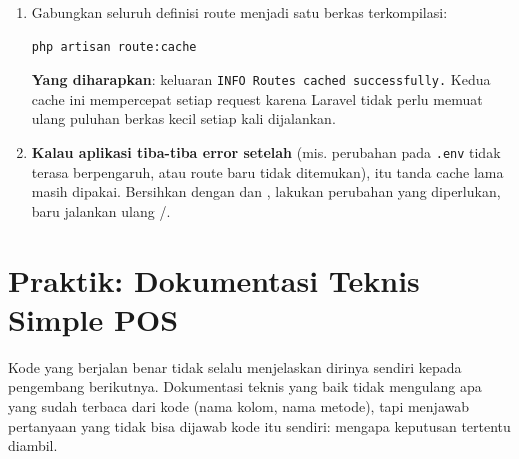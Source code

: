 \begin{enumerate}
    \texttt{INFO Configuration cached successfully.}
  \item Gabungkan seluruh definisi route menjadi satu berkas
    terkompilasi:
    \begin{lstlisting}[language=bash]
php artisan route:cache
    \end{lstlisting}
    \textbf{Yang diharapkan}: keluaran \texttt{INFO Routes cached
    successfully.} Kedua cache ini mempercepat setiap request karena
    Laravel tidak perlu memuat ulang puluhan berkas kecil setiap kali
    dijalankan.
  \item \textbf{Kalau aplikasi tiba-tiba error setelah
    } (mis. perubahan pada \texttt{.env} tidak
    terasa berpengaruh, atau route baru tidak ditemukan), itu tanda
    cache lama masih dipakai. Bersihkan dengan
     dan
    , lakukan perubahan yang
    diperlukan, baru jalankan ulang /.
\end{enumerate}

\section{Praktik: Dokumentasi Teknis Simple POS}
\label{sec:optimasi-dan-deployment-3}

Kode yang berjalan benar tidak selalu menjelaskan dirinya sendiri
kepada pengembang berikutnya. Dokumentasi teknis yang baik tidak
mengulang apa yang sudah terbaca dari kode (nama kolom, nama metode),
tapi menjawab pertanyaan yang tidak bisa dijawab kode itu sendiri:
mengapa keputusan tertentu diambil.

